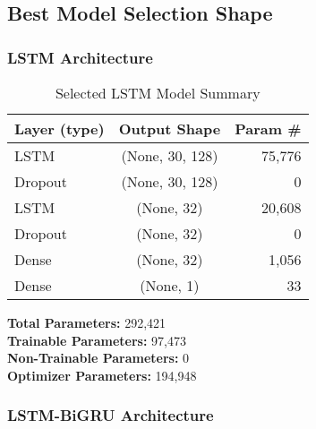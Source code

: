 \clearpage
\subsection{Best Model Selection Shape}
\label{app:modelshape}

\subsubsection{LSTM Architecture}

\begin{table}[H]
\centering
\caption{Selected LSTM Model Summary}
\label{tab:lstm-model-summary}
\begin{tabular}{lcr}
\hline
\textbf{Layer (type)} & \textbf{Output Shape} & \textbf{Param \#} \\
\hline\hline
LSTM & (None, 30, 128) & 75,776 \\
Dropout & (None, 30, 128) & 0 \\
LSTM & (None, 32) & 20,608 \\
Dropout & (None, 32) & 0 \\
Dense & (None, 32) & 1,056 \\
Dense & (None, 1) & 33 \\
\hline
\end{tabular}

\vspace{1em}
\noindent
\textbf{Total Parameters:} 292,421\\
\textbf{Trainable Parameters:} 97,473\\
\textbf{Non-Trainable Parameters:} 0\\
\textbf{Optimizer Parameters:} 194,948
\end{table}

\subsubsection{LSTM-BiGRU Architecture}

